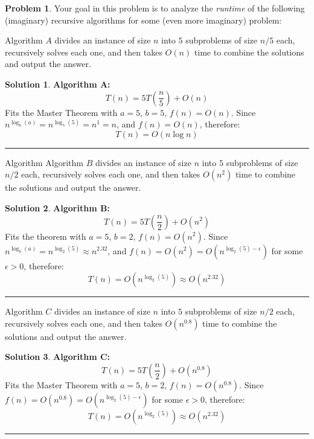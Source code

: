 \documentclass{article}
\theoremstyle{definition}
\newtheorem{problem}{Problem}
\def\fline{\rule{0.75\linewidth}{0.5pt}}
\newcommand{\finishline}{\begin{center}\fline\end{center}}
\newtheorem*{solution*}{Solution}
\newenvironment{solution}{\begin{solution*}}{{\finishline} \end{solution*}}
\begin{document}
		
\begin{problem}
	Your goal in this problem is to analyze the \emph{runtime} of the following (imaginary) recursive algorithms for some (even more imaginary) problem:
	\begin{enumerate}[label=(\Alph*)]
	
		
		\item  Algorithm $A$ divides an instance of size $n$ into $5$ subproblems of size $n/5$ each, recursively solves each one, and then takes $O(n)$ time 
		to combine the solutions and output the answer.
		
		\begin{solution}
			\item \textbf{Algorithm A:}
			\[
			T(n) = 5T\left(\frac{n}{5}\right) + O(n)
			\]
			Fits the Master Theorem with $a=5$, $b=5$, $f(n)=O(n)$. Since $n^{\log_b(a)} = n^{\log_5(5)} = n^1 = n$, and $f(n) = O(n)$, therefore:
			\[
			T(n) = O(n \log n)
			\]
		\end{solution}

		\item Algorithm  Algorithm $B$ divides an instance of size $n$ into $5$ subproblems of size $n/2$ each, recursively solves each one, and then takes $O(n^2)$ time 
		to combine the solutions and output the answer. 
		 
		
		\begin{solution}
			\item \textbf{Algorithm B:}  
			\[
			T(n) = 5T\left(\frac{n}{2}\right) + O(n^2)
			\]
			Fits the theorem with $a=5$, $b=2$, $f(n)=O(n^2)$. Since $n^{\log_b(a)} = n^{\log_2(5)} \approx n^{2.32}$, and $f(n) = O(n^2) = O(n^{\log_2(5) - \epsilon})$ for some $\epsilon > 0$, therefore:
			\[
			T(n) = O(n^{\log_2(5)}) \approx O(n^{2.32})
			\]
		\end{solution}

		\item Algorithm $C$ divides an instance of size $n$ into $5$ subproblems of size $n/2$ each, recursively solves each one, and then takes $O(n^{0.8})$ time 
		to combine the solutions and output the answer.  
	    	\begin{solution}
			\item \textbf{Algorithm C:}
			\[
			T(n) = 5T\left(\frac{n}{2}\right) + O(n^{0.8})
			\]
			Fits the Master Theorem with $a=5$, $b=2$, $f(n)=O(n^{0.8})$. Since $f(n) = O(n^{0.8}) = O(n^{\log_2(5) - \epsilon})$ for some $\epsilon > 0$, therefore:
			\[
			T(n) = O(n^{\log_2(5)}) \approx O(n^{2.32})
			\]
		\end{solution}


\end{enumerate}
\end{problem}
\end{document}
